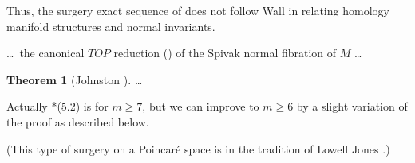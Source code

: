 \documentclass{article}
\newtheorem{thm}{Theorem}[section]
\begin{document}
Thus, the surgery exact sequence of
\cite{BFMW} does not follow Wall \cite{Wa} in
relating homology manifold structures and
normal invariants.

\dots\ the canonical $TOP$ reduction
(\cite{FP}) of the Spivak normal fibration of
$M$ \dots

\begin{thm}[Johnston \cite{Jo}]
\dots
\end{thm}

Actually \cite{Jo}*{(5.2)} is for $m\geq 7$,
but we can improve to $m\geq 6$ by a slight
variation of the proof as described below.

(This type of surgery on a Poincar\'e space
is in the tradition of Lowell Jones
\cite{Jn}.)



\end{document}
